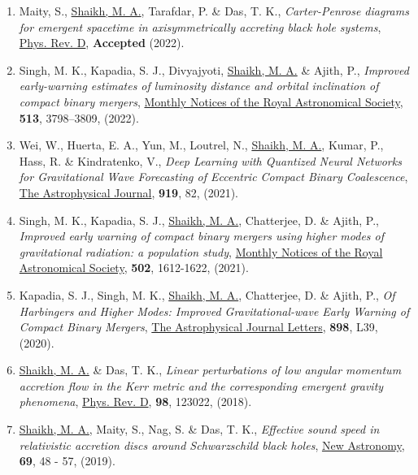 \begin{enumerate}
\item Maity, S., \underline{Shaikh, M. A.}, Tarafdar, P. \& Das, T. K., {\itshape {Carter-Penrose diagrams for emergent spacetime in axisymmetrically accreting black hole systems}}, \href{https://journals.aps.org/prd/accepted/6a071Q0dF6310e3391c4857600be1cb84620086cd?fbclid=IwAR3b3H83dOHQq9BihVVwKJMehm5EX3b2mSBVduUXGBPgL8dWPUR7LDcVCnI}{{Phys. Rev. D}}, {\bfseries Accepted} (2022).
\item Singh, M. K., Kapadia, S. J., Divyajyoti, \underline{Shaikh, M. A.} \& Ajith, P., {\itshape {Improved early-warning estimates of luminosity distance and orbital inclination of compact binary mergers}}, \href{https://doi.org/10.1093/mnras/stac852}{{Monthly Notices of the Royal Astronomical Society}}, {\bfseries 513}, 3798–3809, (2022).
\item Wei, W., Huerta, E. A., Yun, M., Loutrel, N.,  \underline{Shaikh, M. A.}, Kumar, P., Hass, R. \& Kindratenko, V., {\itshape  Deep Learning with Quantized Neural Networks for Gravitational Wave Forecasting of Eccentric Compact Binary Coalescence}, \href{https://iopscience.iop.org/article/10.3847/1538-4357/ac1121}{The Astrophysical Journal}, {\bfseries 919}, 82, (2021).
\item Singh, M. K., Kapadia, S. J., \underline{Shaikh, M. A.}, Chatterjee, D. \& Ajith, P., {\itshape {Improved early warning of compact binary mergers using higher modes of gravitational radiation: a population study}}, \href{https://doi.org/10.1093/mnras/stab125}{{Monthly Notices of the Royal Astronomical Society}}, {\bfseries 502}, 1612-1622, (2021).
\item Kapadia, S. J., Singh, M. K., \underline{Shaikh, M. A.}, Chatterjee, D. \& Ajith, P., {\itshape Of Harbingers and Higher Modes: Improved Gravitational-wave Early Warning of Compact Binary Mergers}, \href{https://doi.org/10.3847%2F2041-8213%2Faba42d}{{The Astrophysical Journal Letters}}, {\bfseries 898}, L39, (2020).
\item \underline{Shaikh, M. A.} \& Das, T. K., {\itshape Linear perturbations of low angular momentum accretion flow in the Kerr metric and the corresponding emergent gravity phenomena}, \href{https://link.aps.org/doi/10.1103/PhysRevD.98.123022}{{Phys. Rev. D}}, {\bfseries 98}, 123022, (2018).
\item \underline{Shaikh, M. A.}, Maity, S., Nag, S. \& Das, T. K., {\itshape Effective sound speed in relativistic accretion discs around Schwarzschild black holes}, \href{http://www.sciencedirect.com/science/article/pii/S1384107618302896}{{New Astronomy}}, {\bfseries 69}, 48 - 57, (2019).

\end{enumerate}
